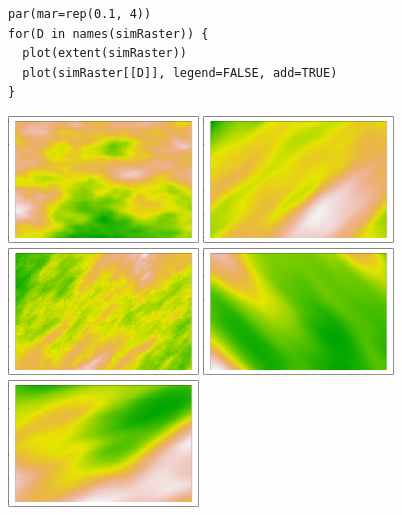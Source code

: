 \documentclass[article,nojss]{jss}\usepackage[]{graphicx}\usepackage[]{color}
\makeatletter
\newenvironment{kframe}{%
 \def\at@end@of@kframe{}%
 \ifinner\ifhmode%
  \def\at@end@of@kframe{\end{minipage}}%
  \begin{minipage}{\columnwidth}%
 \fi\fi%
 \def\FrameCommand##1{\hskip\@totalleftmargin \hskip-\fboxsep
 \colorbox{shadecolor}{##1}\hskip-\fboxsep
     \hskip-\linewidth \hskip-\@totalleftmargin \hskip\columnwidth}%
 \MakeFramed {\advance\hsize-\width
   \@totalleftmargin\z@ \linewidth\hsize
   \@setminipage}}%
 {\par\unskip\endMakeFramed%
 \at@end@of@kframe}
\newenvironment{knitrout}{}{} %
\makeatother
\begin{document}
\begin{figure}[H]
\centering
\begin{knitrout}
\color{fgcolor}\begin{kframe}
\begin{verbatim}
par(mar=rep(0.1, 4))
for(D in names(simRaster)) {
  plot(extent(simRaster))
  plot(simRaster[[D]], legend=FALSE, add=TRUE)
}
\end{verbatim}
\end{kframe}
\includegraphics[width=0.45\textwidth]{figure/maternplot-1} 
\includegraphics[width=0.45\textwidth]{figure/maternplot-2} 
\includegraphics[width=0.45\textwidth]{figure/maternplot-3} 
\includegraphics[width=0.45\textwidth]{figure/maternplot-4} 
\includegraphics[width=0.45\textwidth]{figure/maternplot-5} 

\end{knitrout}
\end{figure}
\end{document}
